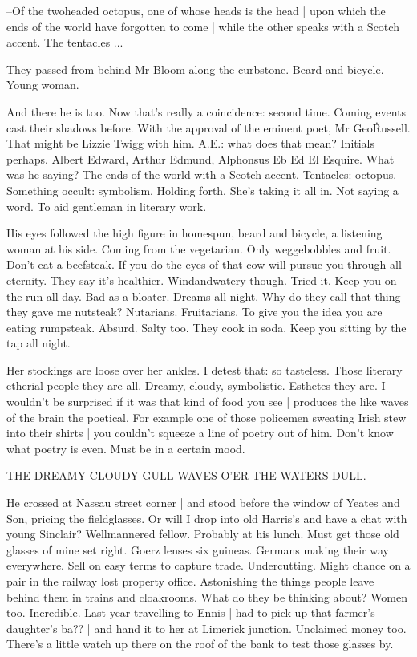 --Of the twoheaded octopus,
one of whose heads is the head |
upon which the ends of the world have forgotten to come |
while the other speaks with a Scotch accent.
The tentacles ...

They passed from behind Mr Bloom along the curbstone.
Beard and bicycle.
Young woman.

And there he is too.
Now that's really a coincidence:
second time.
Coming events cast their shadows before.
With the approval of the eminent poet,
Mr Geo\. Russell.
That might be Lizzie Twigg with him.
A.E.:
what does that mean?
Initials perhaps.
Albert Edward,
Arthur Edmund,
Alphonsus Eb Ed El Esquire.
What was he saying?
The ends of the world with a Scotch accent.
Tentacles:
octopus.
Something occult:
symbolism.
Holding forth.
She's taking it all in.
Not saying a word.
To aid gentleman in literary work.

His eyes followed the high figure in homespun,
beard and bicycle,
a listening woman at his side.
Coming from the vegetarian.
Only weggebobbles and fruit.
Don't eat a beefsteak.
If you do
the eyes of that cow will pursue you through all eternity.
They say it's healthier.
Windandwatery though.
Tried it.
Keep you on the run all day.
Bad as a bloater.
Dreams all night.
Why do they call that thing they gave me nutsteak?
Nutarians.
Fruitarians.
To give you the idea you are eating rumpsteak.
Absurd.
Salty too.
They cook in soda.
Keep you sitting by the tap all night.

Her stockings are loose over her ankles.
I detest that:
so tasteless.
Those literary etherial people they are all.
Dreamy,
cloudy,
symbolistic.
Esthetes they are.
I wouldn't be surprised if it was that kind of food you see |
produces the like waves of the brain the poetical.
For example
one of those policemen sweating Irish stew into their shirts |
you couldn't squeeze a line of poetry out of him.
Don't know what poetry is even.
Must be in a certain mood.


    THE DREAMY CLOUDY GULL
    WAVES O'ER THE WATERS DULL.


He crossed at Nassau street corner |
and stood before the window of Yeates and Son,
pricing the fieldglasses.
Or will I drop into old Harris's
and have a chat with young Sinclair?
Wellmannered fellow.
Probably at his lunch.
Must get those old glasses of mine set right.
Goerz lenses six guineas.
Germans making their way everywhere.
Sell on easy terms to capture trade.
Undercutting.
Might chance on a pair in the railway lost property office.
Astonishing the things people leave behind them in trains and cloakrooms.
What do they be thinking about?
Women too.
Incredible.
Last year travelling to Ennis |
had to pick up that farmer's daughter's ba?? |
and hand it to her at Limerick junction.
Unclaimed money too.
There's a little watch up there on the roof of the bank 
to test those glasses by.

